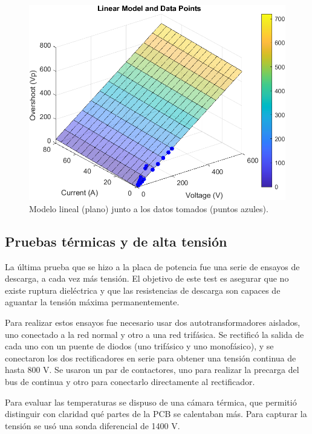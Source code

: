 \begin{figure}[H]
	\centering
	\includegraphics[width=0.7\linewidth]{fig/overshootFinal3}
	\caption{Modelo lineal (plano) junto a los datos tomados (puntos azules).}
\end{figure}


\subsection{Pruebas térmicas y de alta tensión}

La última prueba que se hizo a la placa de potencia fue una serie de ensayos de descarga, a cada vez más tensión. El objetivo de este test es asegurar que no existe ruptura dieléctrica y que las resistencias de descarga son capaces de aguantar la tensión máxima permanentemente.

Para realizar estos ensayos fue necesario usar dos autotransformadores aislados, uno conectado a la red normal y otro a una red trifásica. Se rectificó la salida de cada uno con un puente de diodos (uno trifásico y uno monofásico), y se conectaron los dos rectificadores en serie para obtener una tensión continua de hasta 800 V. Se usaron un par de contactores, uno para realizar la precarga del bus de continua y otro para conectarlo directamente al rectificador.

Para evaluar las temperaturas se dispuso de una cámara térmica, que permitió distinguir con claridad qué partes de la PCB se calentaban más. Para capturar la tensión se usó una sonda diferencial de 1400 V.


